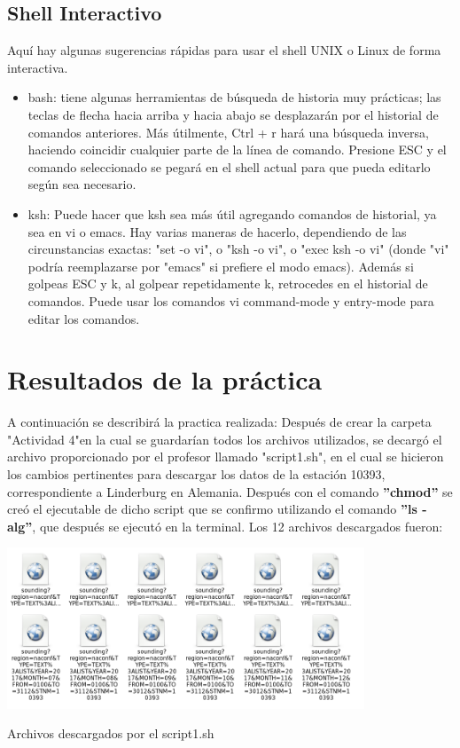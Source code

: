 \documentclass{article}
\begin{document}
\subsection{Shell Interactivo}
Aquí hay algunas sugerencias rápidas para usar el shell UNIX o Linux de forma interactiva.

\begin{itemize}
\item bash:
tiene algunas herramientas de búsqueda de historia muy prácticas; las teclas de flecha hacia arriba y hacia abajo se desplazarán por el historial de comandos anteriores. Más útilmente, Ctrl + r hará una búsqueda inversa, haciendo coincidir cualquier parte de la línea de comando. Presione ESC y el comando seleccionado se pegará en el shell actual para que pueda editarlo según sea necesario.
\item ksh:
Puede hacer que ksh sea más útil agregando comandos de historial, ya sea en vi o emacs. Hay varias maneras de hacerlo, dependiendo de las circunstancias exactas: "set -o vi", o "ksh -o vi", o "exec ksh -o vi" (donde "vi" podría reemplazarse por "emacs" si prefiere el modo emacs). Además si golpeas ESC y k, al golpear repetidamente k, retrocedes en el historial de comandos. Puede usar los comandos vi command-mode y entry-mode para editar los comandos.
\end{itemize} 


\section{Resultados de la práctica}
A continuación se describirá la practica realizada:
Después de crear la carpeta "Actividad 4"en la cual se guardarían todos los archivos utilizados, se decargó el archivo proporcionado por el profesor llamado "script1.sh", en el cual se hicieron los cambios pertinentes para descargar los datos de la estación 10393, correspondiente a Linderburg en Alemania. Después con el comando \textbf{''chmod''} se creó el ejecutable de dicho script que se confirmo utilizando el comando \textbf{''ls -alg''}, que después se ejecutó en la terminal. Los 12 archivos descargados fueron:
\begin{center}
 \includegraphics[width=0.8\textwidth]{archivosdescargados.png}

 Archivos descargados por el script1.sh
\end{center}
\end{document}
